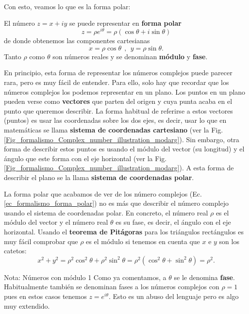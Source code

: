\documentclass[a4paper,11pt]{book} %
\numberwithin{equation}{chapter}
\begin{document}
Con esto, veamos lo que es la forma polar:
	\begin{mybox_gray2}{}
	El número $z=x + i y$ se puede representar en \textbf{forma polar}
		\begin{equation}  \label{ec_formalismo_forma_polar}
		z = \rho e^{i\theta} = \rho (\cos\theta + i \sin\theta)  
		\end{equation}
	de donde obtenemos las componentes cartesianas 
		\begin{equation}
		x=\rho\cos\theta ~~,~~y=\rho\sin\theta.
		\end{equation}
 	Tanto $\rho$ como $\theta$ son números reales y se denominan \textbf{módulo} y \textbf{fase}.
	\end{mybox_gray2}
	
	En principio, esta forma de representar los números complejos puede parecer rara, pero es muy fácil de entender. Para ello, solo hay que recordar que los números complejos los podemos representar en un plano. Los puntos en un plano pueden verse como \textbf{vectores} que parten del origen y cuya punta acaba en el punto que queremos describir. La forma habitual de referirse a estos vectores (puntos) es usar las coordenadas sobre los dos ejes, es decir, usar lo que en matemáticas se llama \textbf{sistema de coordenadas cartesiano} (ver la Fig. \ref{Fig_formalismo_Complex_number_illustration_modarg}). Sin embargo, otra forma de describir estos puntos es usando el módulo del vector (su longitud) y el ángulo que este forma con el eje horizontal (ver la Fig. \ref{Fig_formalismo_Complex_number_illustration_modarg}). A esta forma de describir el plano se la llama \textbf{sistema de coordenadas polar}.
	
	La forma polar que acabamos de ver de los número complejos (Ec. \ref{ec_formalismo_forma_polar}) no es más que describir el número complejo usando el sistema de coordenadas polar. En concreto, el número real $\rho$ es el módulo del vector y el número real $\theta$ es su fase, es decir, el ángulo con el eje horizontal. Usando el \textbf{teorema de Pitágoras} para los triángulos rectángulos es muy fácil comprobar que $\rho$ es el módulo si tenemos en cuenta que $x$ e $y$ son los catetos:
	$$
	x^2 + y^2 = \rho^2 \cos^2 \theta + \rho^2 \sin^2 \theta = \rho^2 (\cos^2 \theta +  \sin^2 \theta) =  \rho^2.
	$$

	\begin{mybox_blue}{Nota: Números con módulo 1}
	Como ya comentamos, a $\theta$ se le denomina \textbf{fase}. Habitualmente también se denominan fases a los números complejos con $\rho =1$ pues en estos casos tenemos $z = e^{i \theta}$. Esto es un abuso del lenguaje pero es algo muy extendido.
	\end{mybox_blue}
\end{document}
